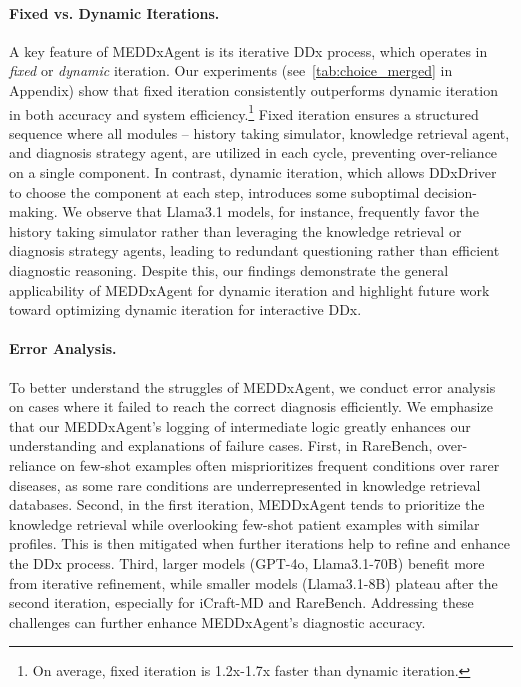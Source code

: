 \vspace{-0.5em}
\label{analysis}
\paragraph{Fixed vs. Dynamic Iterations.}
A key feature of MEDDxAgent is its iterative DDx process, which operates in \textit{fixed} or \textit{dynamic} iteration. Our experiments (see~\autoref{tab:choice_merged} in Appendix) show that fixed iteration consistently outperforms dynamic iteration in both accuracy and system efficiency.\footnote{On average, fixed iteration is 1.2x-1.7x faster than dynamic iteration.} Fixed iteration ensures a structured sequence where all modules -- history taking simulator, knowledge retrieval agent, and diagnosis strategy agent, are utilized in each cycle, preventing over-reliance on a single component. In contrast, dynamic iteration, which allows DDxDriver to choose the component at each step, introduces some suboptimal decision-making. We observe that Llama3.1 models, for instance, frequently favor the history taking simulator rather than leveraging the knowledge retrieval or diagnosis strategy agents, leading to redundant questioning rather than efficient diagnostic reasoning. Despite this, our findings demonstrate the general applicability of MEDDxAgent for dynamic iteration and highlight future work toward optimizing dynamic iteration for interactive DDx.

\paragraph{Error Analysis.}
To better understand the struggles of MEDDxAgent, we conduct error analysis on cases where it failed to reach the correct diagnosis efficiently. We emphasize that our MEDDxAgent's logging of intermediate logic greatly enhances our understanding and explanations of failure cases. First, in RareBench, over-reliance on few-shot examples often misprioritizes frequent conditions over rarer diseases, as some rare conditions are underrepresented in knowledge retrieval databases. Second, in the first iteration, MEDDxAgent tends to prioritize the knowledge retrieval while overlooking few-shot patient examples with similar profiles. This is then mitigated when further iterations help to refine and enhance the DDx process.
Third, larger models (GPT-4o, Llama3.1-70B) benefit more from iterative refinement, while smaller models (Llama3.1-8B) plateau after the second iteration, especially for iCraft-MD and RareBench. Addressing these challenges can further enhance MEDDxAgent’s diagnostic accuracy.